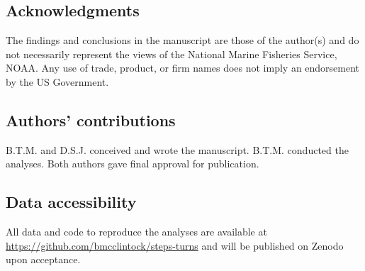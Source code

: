 \documentclass[12pt]{article}\usepackage[]{graphicx}\usepackage[]{xcolor}
\renewcommand{\baselinestretch}{1.3}
\begin{document}
{\small
\subsection*{Acknowledgments}
The findings and conclusions in the manuscript are those of the author(s) and do not necessarily represent the views of the National Marine Fisheries Service, NOAA. Any use of trade, product, or firm names does not imply an endorsement by the US Government.

\subsection*{Authors' contributions}
B.T.M. and D.S.J. conceived and wrote the manuscript. B.T.M. conducted the analyses. Both authors gave final approval for publication.

\subsection*{Data accessibility}
All data and code to reproduce the analyses are available at \url{https://github.com/bmcclintock/steps-turns} and will be published on Zenodo upon acceptance.
}



\clearpage{}



\newpage{}

\linenumbers

\end{document}
